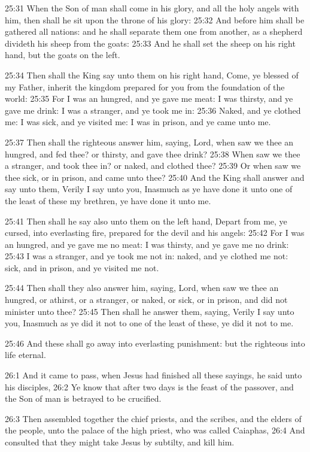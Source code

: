 25:31 When the Son of man shall come in his glory, and all the holy angels with him, then shall he sit upon the throne of his glory: 25:32 And before him shall be gathered all nations: and he shall separate them one from another, as a shepherd divideth his sheep from the goats: 25:33 And he shall set the sheep on his right hand, but the goats on the left.

25:34 Then shall the King say unto them on his right hand, Come, ye blessed of my Father, inherit the kingdom prepared for you from the foundation of the world: 25:35 For I was an hungred, and ye gave me meat: I was thirsty, and ye gave me drink: I was a stranger, and ye took me in: 25:36 Naked, and ye clothed me: I was sick, and ye visited me: I was in prison, and ye came unto me.

25:37 Then shall the righteous answer him, saying, Lord, when saw we thee an hungred, and fed thee? or thirsty, and gave thee drink?  25:38 When saw we thee a stranger, and took thee in? or naked, and clothed thee?  25:39 Or when saw we thee sick, or in prison, and came unto thee?  25:40 And the King shall answer and say unto them, Verily I say unto you, Inasmuch as ye have done it unto one of the least of these my brethren, ye have done it unto me.

25:41 Then shall he say also unto them on the left hand, Depart from me, ye cursed, into everlasting fire, prepared for the devil and his angels: 25:42 For I was an hungred, and ye gave me no meat: I was thirsty, and ye gave me no drink: 25:43 I was a stranger, and ye took me not in: naked, and ye clothed me not: sick, and in prison, and ye visited me not.

25:44 Then shall they also answer him, saying, Lord, when saw we thee an hungred, or athirst, or a stranger, or naked, or sick, or in prison, and did not minister unto thee?  25:45 Then shall he answer them, saying, Verily I say unto you, Inasmuch as ye did it not to one of the least of these, ye did it not to me.

25:46 And these shall go away into everlasting punishment: but the righteous into life eternal.

26:1 And it came to pass, when Jesus had finished all these sayings, he said unto his disciples, 26:2 Ye know that after two days is the feast of the passover, and the Son of man is betrayed to be crucified.

26:3 Then assembled together the chief priests, and the scribes, and the elders of the people, unto the palace of the high priest, who was called Caiaphas, 26:4 And consulted that they might take Jesus by subtilty, and kill him.

